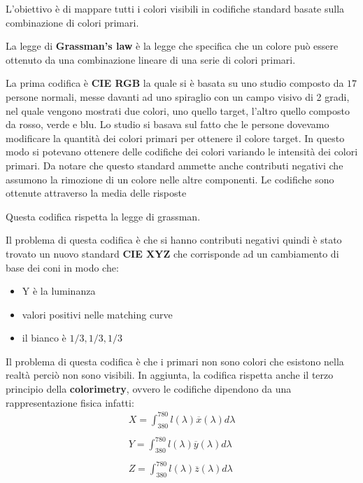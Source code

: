 L'obiettivo è di mappare tutti i colori visibili in codifiche standard basate sulla 
combinazione di colori primari.

\begin{definizione}
    La legge di \textbf{Grassman's law} è la legge che specifica che un colore può 
    essere ottenuto da una combinazione lineare di una serie di colori primari.
\end{definizione}

La prima codifica è \textbf{CIE RGB} la quale si è basata su uno studio composto da 
$17$ persone normali, messe davanti ad uno spiraglio con un campo visivo di 2 gradi,
nel quale vengono mostrati due colori, uno quello target, l'altro quello composto 
da rosso, verde e blu. Lo studio si basava sul fatto che le persone dovevamo modificare 
la quantità dei colori primari per ottenere il colore target. In questo modo si 
potevano ottenere delle codifiche dei colori variando le intensità dei colori primari. 
Da notare che questo standard ammette anche contributi negativi che assumono la rimozione 
di un colore nelle altre componenti. Le codifiche sono ottenute attraverso la media 
delle risposte

\begin{nota}
    Questa codifica rispetta la legge di grassman.
\end{nota}

Il problema di questa codifica è che si hanno contributi negativi quindi è stato trovato un nuovo 
standard \textbf{CIE XYZ} che corrisponde ad un cambiamento di base dei coni in modo 
che:
\begin{itemize}
    \item Y è la luminanza
    \item valori positivi nelle matching curve 
    \item il bianco è $1/3, 1/3, 1/3$
\end{itemize}
Il problema di questa codifica è che i primari non sono colori che esistono nella realtà
perciò non sono visibili. In aggiunta, la codifica rispetta anche il terzo principio 
della \textbf{colorimetry}, ovvero le codifiche dipendono da una rappresentazione 
fisica infatti:
$$\begin{array}{c}
    X = \int_{380}^{780} l(\lambda) \overline{x}(\lambda)d \lambda\\\\
    Y = \int_{380}^{780} l(\lambda) \overline{y}(\lambda)d \lambda\\\\
    Z = \int_{380}^{780} l(\lambda) \overline{z}(\lambda)d \lambda\\\\
\end{array}$$

